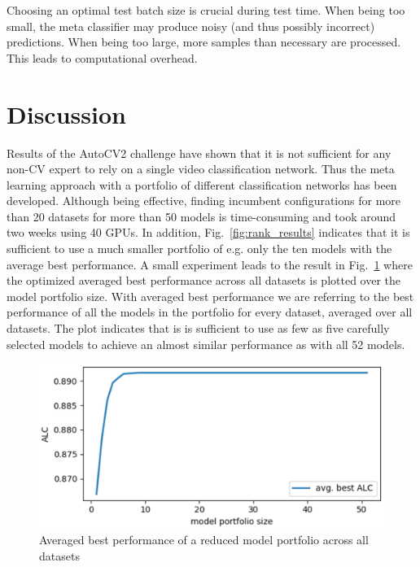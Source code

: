 \documentclass{article}
\begin{document}
Choosing an optimal test batch size is crucial during test time. When being too small, the meta classifier may produce noisy (and thus possibly incorrect) predictions. When being too large, more samples than necessary are processed. This leads to computational overhead. 

\section{Discussion}
\label{sec:discussion}

Results of the AutoCV2 challenge have shown that it is not sufficient for any non-CV expert to rely on a single video classification network. Thus the meta learning approach with a portfolio of different classification networks has been developed. Although being effective, finding incumbent configurations for more than 20 datasets for more than 50 models is time-consuming and took around two weeks using 40 GPUs. In addition, Fig.~\ref{fig:rank_results} indicates that it is sufficient to use a much smaller portfolio of e.g. only the ten models with the average best performance. A small experiment leads to the result in Fig.~\ref{fig:portfolio_performance} where the optimized averaged best performance across all datasets is plotted over the model portfolio size.  With averaged best performance we are referring to the best performance of all the models in the portfolio for every dataset, averaged over all datasets. The plot indicates that is is sufficient to use as few as five carefully selected models to achieve an almost similar performance as with all 52 models.
%
\begin{figure}[htb]
\begin{center}
 	\includegraphics[width=0.85\linewidth]{../figures/portfolio_performance.eps} 
\end{center}
\caption{Averaged best performance of a reduced model portfolio across all datasets}
\label{fig:portfolio_performance}
\end{figure} 
%
\end{document}
